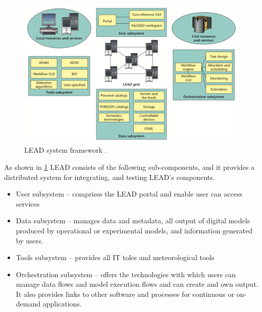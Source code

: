\begin{figure}[htp]
    \centering
    \includegraphics[width=1.0\textwidth]{lit/lead/LEAD-system-framework-LEAD-is-composed-of-several-interacting-subsystems-with-the-LEAD_W640.png}
    \caption[LEAD system framework]{LEAD system framework \cite{Droegemeier2005Service-OrientedWeather}.}
    \label{fi:lead_framework}
\end{figure}

As shown in \cref{fi:lead_framework} LEAD consists of the following sub-components, and it provides a distributed system for integrating, and testing LEAD's components.
\begin{itemize}
    \item User subsystem -- comprises the LEAD portal and enable user can access services
    \item Data subsystem -- manages data and metadata, all output of digital models produced by operational or experimental models, and information generated by users.
    \item Tools subsystem -- provides all IT toles and  meteorological tools
    \item Orchestration subsystem -- offers the technologies with which users can manage data flows and model execution flows and can create and own output. It also provides links to other software and processes for continuous or on-demand applications.
\end{itemize}

